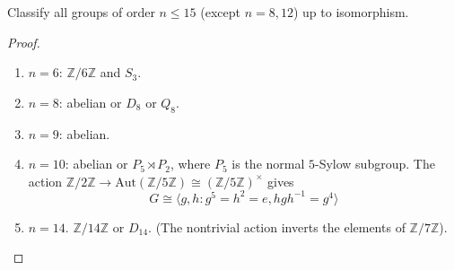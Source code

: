 \documentclass[openany]{book}
\newcommand{\Z}{\mathbb{Z}}
\newcommand{\la}{\langle}
\newcommand{\ra}{\rangle}
\begin{document}
\begin{prob}[2.15]
Classify all groups of order \( n \leq 15 \) (except \( n = 8, 12 \)) up to isomorphism.
\end{prob}
\begin{proof}
    \begin{enumerate}
        \item $n=6$: $\Z/6\Z$ and $S_3$.
        \item $n=8$: abelian or $D_8$ or $Q_8$.
        \item $n=9$: abelian.
        \item $n=10$: abelian or $P_5\rtimes P_2$, where $P_5$ is the normal $5$-Sylow subgroup. The action $\Z/2\Z\to\text{Aut}(\Z/5\Z)\cong(\Z/5\Z)^\times$ gives 
        \begin{equation*}
            G\cong \la g,h: g^5=h^2=e, hgh^{-1}=g^4\ra
        \end{equation*}
        \item $n=14$. $\Z/14\Z$ or $D_{14}$. (The nontrivial action inverts the elements of $\Z/7\Z$).
    \end{enumerate}
\end{proof}



    
\end{document}
